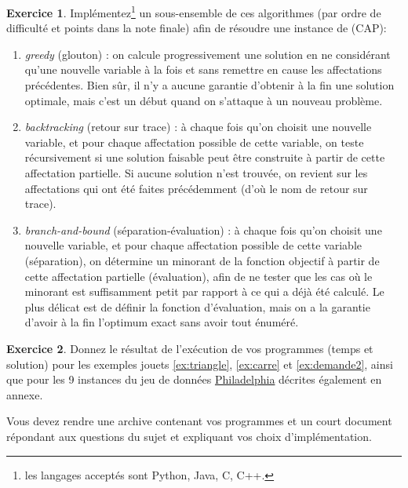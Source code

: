 \documentclass[a4paper,francais]{article}
\theoremstyle{definition}
\newtheorem{exercice}{Exercice}[section]
\begin{document}
\begin{exercice}
  Implémentez\footnote{
    les langages acceptés sont Python, Java, C, C++. } un
  sous-ensemble de ces algorithmes (par ordre de difficulté et points
  dans la note finale) afin de résoudre une instance de (CAP):
  \begin{enumerate}
  \item \emph{greedy} (glouton) : on calcule 
    progressivement une solution en ne considérant qu'une
    nouvelle variable à la fois et sans remettre en cause
    les affectations précédentes.
    Bien sûr, il n'y a aucune garantie d'obtenir à la fin une
    solution optimale, mais c'est un début quand on s'attaque à
    un nouveau problème. 
  \item \emph{backtracking} (retour sur trace) : à chaque fois
    qu'on choisit une nouvelle variable, et pour chaque affectation
    possible de cette variable, on teste récursivement si une
    solution faisable peut être construite à partir de cette
    affectation partielle. Si aucune solution n'est trouvée,
    on revient sur les affectations qui ont été faites précédemment
    (d'où le nom de retour sur trace).
  \item \emph{branch-and-bound} (séparation-évaluation) :
    à chaque fois qu'on choisit une nouvelle variable, et pour
    chaque affectation possible de cette variable (séparation),
    on détermine un minorant de la fonction objectif à partir
    de cette affectation partielle (évaluation), afin de ne tester
    que les cas où le minorant est suffisamment petit par rapport
    à ce qui a déjà été calculé. Le plus délicat est de définir
    la fonction d'évaluation, mais on a la garantie d'avoir à
    la fin l'optimum exact sans avoir tout énuméré. 
  \end{enumerate}
\end{exercice}

\begin{exercice}
  Donnez le résultat de l'exécution de vos programmes (temps et solution)
  pour les exemples jouets \ref{ex:triangle}, \ref{ex:carre} et \ref{ex:demande2},
  ainsi que pour les 9 instances du jeu de données
  \href{http://fap.zib.de/problems/Philadelphia/}{Philadelphia}
  décrites également en annexe. 
\end{exercice}

Vous devez rendre une archive contenant vos programmes et un
court document répondant aux questions du sujet et expliquant
vos choix d'implémentation. 

\appendix
\end{document}
